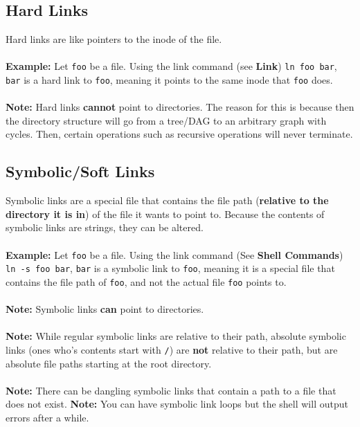 \documentclass[13pt]{article}
\begin{document}
\subsection{Hard Links}
Hard links are like pointers to the inode of the file. \\ \\
\textbf{Example:} Let \texttt{foo} be a file. Using the link command (see \textbf{Link}) \texttt{ln foo bar}, \texttt{bar} is a hard link to \texttt{foo}, meaning it points to the same inode that \texttt{foo} does. \\ \\
\textbf{Note:} Hard links \textbf{cannot} point to directories. The reason for this is because then the directory structure will go from a tree/DAG to an arbitrary graph with cycles. Then, certain operations such as recursive operations will never terminate.

\subsection{Symbolic/Soft Links}
Symbolic links are a special file that contains the file path (\textbf{relative to the directory it is in}) of the file it wants to point to. Because the contents of symbolic links are strings, they can be altered. \\ \\
\textbf{Example:} Let \texttt{foo} be a file. Using the link command (See \textbf{Shell Commands}) \texttt{ln -s foo bar}, \texttt{bar} is a symbolic link to \texttt{foo}, meaning it is a special file that contains the file path of \texttt{foo}, and not the actual file \texttt{foo} points to. \\ \\
\textbf{Note:} Symbolic links \textbf{can} point to directories. \\ \\
\textbf{Note:} While regular symbolic links are relative to their path, absolute symbolic links (ones who's contents start with \texttt{/}) are \textbf{not} relative to their path, but are absolute file paths starting at the root directory. \\ \\
\textbf{Note:} There can be dangling symbolic links that contain a path to a file that does not exist. 
\textbf{Note:} You can have symbolic link loops but the shell will output errors after a while.
\end{document}
